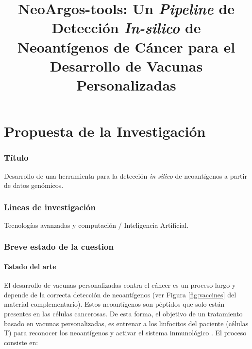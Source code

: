 \documentclass[a4paper,11pt]{article}
\title{ 
	
	NeoArgos-tools: Un \textit{Pipeline} de Detección \textit{In-silico} de Neoantígenos de Cáncer para el Desarrollo de Vacunas Personalizadas
}
\author{}
\date{}
\begin{document}
	

	
	
	
	
	
	
	

\part*{Propuesta de la Investigación}

\section{Título}
Desarrollo de una herramienta  para la detección \textit{in silico} de neoantígenos a partir de datos genómicos.

\section{Lineas de investigación}
Tecnologías avanzadas y computación / Inteligencia Artificial.




\section{Breve estado de la cuestion}
	
\subsection{Estado del arte}
	
El desarrollo de vacunas personalizadas contra el cáncer es un proceso largo y depende de la correcta detección de neoantígenos (ver Figura \ref{fig:vaccines} del material complementario). Estos neoantígenos son péptidos que solo están presentes en las células cancerosas. De esta forma, el objetivo de un tratamiento basado en vacunas personalizadas, es entrenar a los linfocitos del paciente (células T) para reconocer los neoantígenos y activar el sistema inmunológico \cite{de2020neoantigen, peng2019neoantigen}. El proceso consiste en: 
	
	
	
\end{document}
